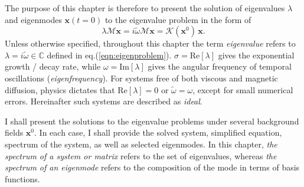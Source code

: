 The purpose of this chapter is therefore to present the solution of eigenvalues $\lambda$ and eigenmodes $\mathbf{x}(t=0)$ to the eigenvalue problem in the form of
\begin{equation}\label{eqn:eigenproblem}
    \lambda \mathcal{M} \mathbf{x} = i \widetilde{\omega} \mathcal{M} \mathbf{x} = \mathcal{K}(\mathbf{x}^0) \, \mathbf{x}.
\end{equation}
Unless otherwise specified, throughout this chapter the term \textit{eigenvalue} refers to $\lambda = i\widetilde{\omega} \in \mathbb{C}$ defined in eq.(\ref{eqn:eigenproblem}). $\sigma = \mathrm{Re}[\lambda]$ gives the exponential growth / decay rate, while $\omega = \mathrm{Im}[\lambda]$ gives the angular frequency of temporal oscillations (\textit{eigenfrequency}).
For systems free of both viscous and magnetic diffusion, physics dictates that $\mathrm{Re}[\lambda] = 0$ or $\widetilde{\omega} = \omega$, except for small numerical errors. Hereinafter such systems are described as \textit{ideal}.

I shall present the solutions to the eigenvalue problems under several background fields $\mathbf{x}^0$. In each case, I shall provide the solved system, simplified equation, spectrum of the system, as well as selected eigenmodes.
In this chapter, \textit{the spectrum of a system or matrix} refers to the set of eigenvalues, whereas \textit{the spectrum of an eigenmode} refers to the composition of the mode in terms of basis functions.

\clearpage















